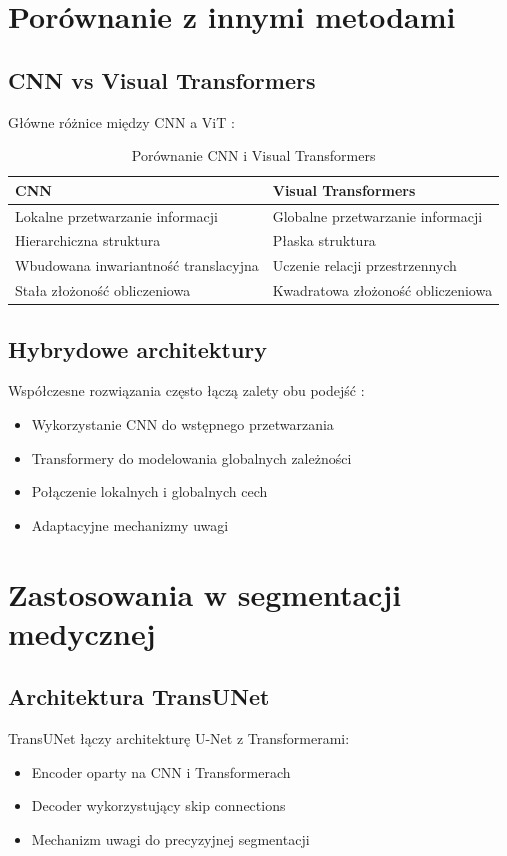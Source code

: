 \section{Porównanie z innymi metodami}
\subsection{CNN vs Visual Transformers}
Główne różnice między CNN a ViT \cite{khan2021transformers}:

\begin{table}[h]
\centering
\begin{tabular}{|p{}|p{}|}
\hline
\textbf{CNN} & \textbf{Visual Transformers} \\
\hline
Lokalne przetwarzanie informacji & Globalne przetwarzanie informacji \\
\hline
Hierarchiczna struktura & Płaska struktura \\
\hline
Wbudowana inwariantność translacyjna & Uczenie relacji przestrzennych \\
\hline
Stała złożoność obliczeniowa & Kwadratowa złożoność obliczeniowa \\
\hline
\end{tabular}
\caption{Porównanie CNN i Visual Transformers}
\label{tab:cnn_vs_vit}
\end{table}

\subsection{Hybrydowe architektury}
Współczesne rozwiązania często łączą zalety obu podejść \cite{chen2021transunet}:
\begin{itemize}
    \item Wykorzystanie CNN do wstępnego przetwarzania
    \item Transformery do modelowania globalnych zależności
    \item Połączenie lokalnych i globalnych cech
    \item Adaptacyjne mechanizmy uwagi
\end{itemize}

\section{Zastosowania w segmentacji medycznej}
\subsection{Architektura TransUNet}
TransUNet \cite{chen2021transunet} łączy architekturę U-Net z Transformerami:
\begin{itemize}
    \item Encoder oparty na CNN i Transformerach
    \item Decoder wykorzystujący skip connections
    \item Mechanizm uwagi do precyzyjnej segmentacji
\end{itemize}

